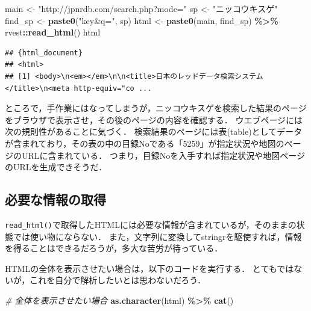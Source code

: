 \documentclass[
]{article}
\newenvironment{Shaded}{\begin{snugshade}}{\end{snugshade}}
\newcommand{\CommentTok}[1]{\textcolor[rgb]{0.56,0.35,0.01}{\textit{#1}}}
\newcommand{\FunctionTok}[1]{\textcolor[rgb]{0.13,0.29,0.53}{\textbf{#1}}}
\newcommand{\NormalTok}[1]{#1}
\newcommand{\OtherTok}[1]{\textcolor[rgb]{0.56,0.35,0.01}{#1}}
\newcommand{\SpecialCharTok}[1]{\textcolor[rgb]{0.81,0.36,0.00}{\textbf{#1}}}
\newcommand{\StringTok}[1]{\textcolor[rgb]{0.31,0.60,0.02}{#1}}
\begin{document}
\begin{Shaded}
\begin{Highlighting}[]
\NormalTok{main }\OtherTok{\textless{}{-}} \StringTok{"http://jpnrdb.com/search.php?mode="}
\NormalTok{sp }\OtherTok{\textless{}{-}} \StringTok{"ニッコウキスゲ"}
\NormalTok{find\_sp }\OtherTok{\textless{}{-}} \FunctionTok{paste0}\NormalTok{(}\StringTok{"key\&q="}\NormalTok{, sp)}
\NormalTok{html }\OtherTok{\textless{}{-}} 
  \FunctionTok{paste0}\NormalTok{(main, find\_sp) }\SpecialCharTok{\%\textgreater{}\%}
\NormalTok{  rvest}\SpecialCharTok{::}\FunctionTok{read\_html}\NormalTok{()}
\NormalTok{html}
\end{Highlighting}
\end{Shaded}

\begin{verbatim}
## {html_document}
## <html>
## [1] <body>\n<em></em>\n\n<title>日本のレッドデータ検索システム</title>\n<meta http-equiv="co ...
\end{verbatim}

ところで，手作業にはなってしまうが，ニッコウキスゲを検索した結果のページをブラウザで表示させ，その後のページの内容を確認する．
ウエブページには次の規則性があることに気づく．
検索結果のページには表(table)としてデータが含まれており，その表の中の目録Noである「5259」が指定状況や地図のページのURLに含まれている．
つまり，目録Noを入手すれば指定状況や地図ページのURLを生成できそうだ．

\hypertarget{ux5fc5ux8981ux306aux60c5ux5831ux306eux53d6ux5f97}{%
\subsection{必要な情報の取得}\label{ux5fc5ux8981ux306aux60c5ux5831ux306eux53d6ux5f97}}

\texttt{read\_html()}で取得したHTMLには必要な情報が含まれているが，そのままの状態では使い物にならない．
また，文字列に変換してstringrを駆使すれば，情報を得ることはできるだろうが，多大な苦労が待っている．

HTMLの全体を表示させたい場合は，以下のコードを実行する．
とてもではないが，これを自分で解析したいとは思わないだろう．

\begin{Shaded}
\begin{Highlighting}[]
 \CommentTok{\# 全体を表示させたい場合}
\FunctionTok{as.character}\NormalTok{(html) }\SpecialCharTok{\%\textgreater{}\%}
  \FunctionTok{cat}\NormalTok{()}
\end{Highlighting}
\end{Shaded}
\end{document}
